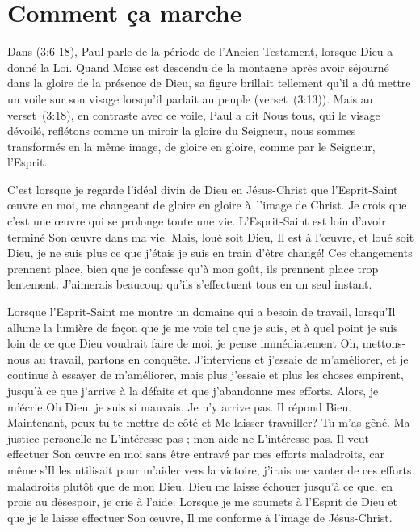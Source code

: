 \section{Comment \c{c}a marche}

Dans (3:6-18), Paul parle de la période
 de l'Ancien Testament, lorsque Dieu a donné la Loi.
 Quand Moïse est descendu de la montagne après avoir séjourné
 dans la gloire de la présence de Dieu,
 sa figure brillait tellement qu'il a dû mettre un voile sur son visage
 lorsqu'il parlait au peuple (verset~(3:13)).
 Mais au verset~(3:18), en contraste avec ce voile,
 Paul a dit\frcolon{}
 \Og Nous tous, qui le visage dévoilé, reflétons comme un miroir
 la gloire du Seigneur, nous sommes transformés en la même image,
 de gloire en gloire, comme par le Seigneur,
 l'Esprit. \Fg{}

C'est lorsque je regarde l'idéal divin de Dieu en Jésus-Christ
 que l'Esprit-Saint œuvre en moi, me changeant de gloire en gloire
 à~l'image de Christ.
 Je crois que c'est une œuvre qui se prolonge toute une vie.
 L'Es\-prit-Saint est loin d'avoir terminé Son œuvre dans ma vie.
 Mais, loué soit Dieu, Il est à l'œuvre, et loué soit Dieu,
 je ne suis plus ce que j'étais
 \ocadr je suis en train d'être changé!
 Ces changements prennent place, bien que je confesse qu'à mon goût, ils prennent place
 trop lentement.
 J'aimerais beaucoup qu'ils s'effectuent tous en un seul instant.

Lorsque l'Esprit-Saint me montre un domaine qui a besoin de travail,
 lorsqu'Il allume la lumière de façon que je me voie tel que je suis,
 et à quel point je suis loin de ce que Dieu voudrait faire de moi,
 je pense immédiatement\frcolon{}
 \Og Oh, mettons-nous au travail, partons en conquête. \Fg{}
 J'interviens et j'essaie de m'améliorer,
 et je continue à essayer de m'améliorer,
 mais plus j'essaie et plus les choses empirent,
 jusqu'à ce que j'arrive à la défaite et que j'abandonne mes efforts.
 Alors, je m'écrie\frcolon{}
 \Og Oh Dieu, je suis si mauvais. Je n'y arrive pas. \Fg{}
 Il répond\frcolon{}
 \Og Bien. Maintenant, peux-tu te mettre de côté et Me laisser travailler?
 Tu m'as gêné. \Fg{}
 Ma justice personelle ne L'intéresse pas ;
 mon aide ne L'intéresse pas.
 Il veut effectuer Son œuvre en moi sans être entravé
 par mes efforts maladroits,
 car même s'Il les utilisait
 pour m'aider vers la victoire,
 j'irais me vanter de ces efforts maladroits plutôt que de mon Dieu.
 Dieu me laisse échouer jusqu'à ce que, en proie au désespoir, je crie à l'aide.
 Lorsque je me soumets à l'Esprit de Dieu et que je le laisse
 effectuer Son œuvre, Il me conforme à l'image de Jésus-Christ.


